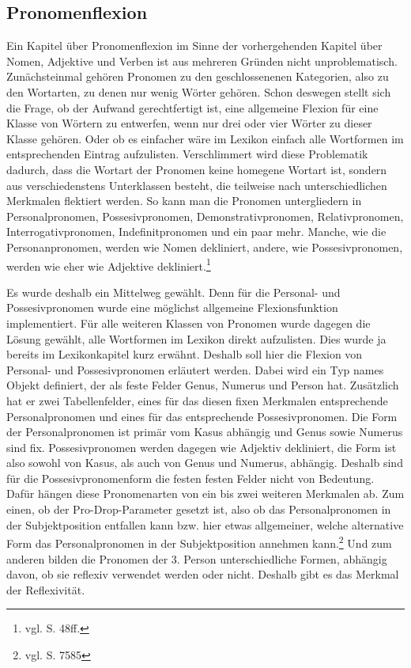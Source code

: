 \documentclass[12pt,abstract=on,titlepage,bibliography=totoc,ngerman,listof=totoc]{scrreprt}
\begin{document}
\subsection{Pronomenflexion}
\label{subsec:pronomen}
Ein Kapitel über Pronomenflexion im Sinne der vorhergehenden Kapitel über Nomen, Adjektive und Verben ist aus mehreren Gründen nicht unproblematisch. Zunächsteinmal gehören Pronomen zu den geschlossenenen Kategorien, also zu den Wortarten, zu denen nur wenig Wörter gehören. Schon deswegen stellt sich die Frage, ob der Aufwand gerechtfertigt ist, eine allgemeine Flexion für eine Klasse von Wörtern zu entwerfen, wenn nur drei oder vier Wörter zu dieser Klasse gehören. Oder ob es einfacher wäre im Lexikon einfach alle Wortformen im entsprechenden Eintrag aufzulisten. Verschlimmert wird diese Problematik dadurch, dass die Wortart der Pronomen keine homegene Wortart ist, sondern aus verschiedenstens Unterklassen besteht, die teilweise nach unterschiedlichen Merkmalen flektiert werden. So kann man die Pronomen untergliedern in Personalpronomen, Possesivpronomen, Demonstrativpronomen, Relativpronomen, Interrogativpronomen, Indefinitpronomen und ein paar mehr. Manche, wie die Personanpronomen, werden wie Nomen dekliniert, andere, wie Possesivpronomen, werden wie eher wie Adjektive dekliniert.\footnote{vgl. \cite{BAYER-LINDAUER1994} S. 48ff.} \par
Es wurde deshalb ein Mittelweg gewählt. Denn für die Personal- und Possesivpronomen wurde eine möglichst allgemeine Flexionsfunktion implementiert. Für alle weiteren Klassen von Pronomen wurde dagegen die Lösung gewählt, alle Wortformen im Lexikon direkt aufzulisten. Dies wurde ja bereits im Lexikonkapitel kurz erwähnt. Deshalb soll hier die Flexion von Personal- und Possesivpronomen erläutert werden. Dabei wird ein Typ names Objekt definiert, der als feste Felder Genus, Numerus und Person hat. Zusätzlich hat er zwei Tabellenfelder, eines für das diesen fixen Merkmalen entsprechende Personalpronomen und eines für das entsprechende Possesivpronomen. Die Form der Personalpronomen ist primär vom Kasus abhängig und Genus sowie Numerus sind fix. Possesivpronomen werden dagegen wie Adjektiv dekliniert, die Form ist also sowohl von Kasus, als auch von Genus und Numerus, abhängig. Deshalb sind für die Possesivpronomenform die festen festen Felder nicht von Bedeutung. Dafür hängen diese Pronomenarten von ein bis zwei weiteren Merkmalen ab. Zum einen, ob der Pro-Drop-Parameter gesetzt ist, also ob das Personalpronomen in der Subjektposition entfallen kann bzw. hier etwas allgemeiner, welche alternative Form das Personalpronomen in der Subjektposition annehmen kann.\footnote{vgl. \cite{METZLER2004} S. 7585} Und zum anderen bilden die Pronomen der 3. Person unterschiedliche Formen, abhängig davon, ob sie reflexiv verwendet werden oder nicht. Deshalb gibt es das Merkmal der Reflexivität. \par
\end{document}
